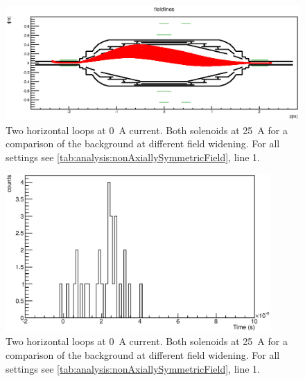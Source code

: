\begin{figure}
\centering
	\centerline{\includegraphics[width = 1.3\linewidth]{graphics/analysis/monSpec/fieldSimulation/ND.eps} }
	
	\caption[\SI{50}{\ampere} loops]{Two horizontal loops at \SI{0}{\ampere} current. Both solenoids at \SI{25}{\ampere} for a comparison of the background at different field widening. For all settings see \ref{tab:analysis:nonAxiallySymmetricField}, line 1.}
	\label{fig:NDf}
\end{figure}

\begin{figure}[h]
\centering
	\includegraphics[width = 0.9\textwidth]{graphics/analysis/monSpec/ND.eps}
	\caption[\SI{50}{\ampere} loops]{Two horizontal loops at \SI{0}{\ampere} current. Both solenoids at \SI{25}{\ampere} for a comparison of the background at different field widening. For all settings see \ref{tab:analysis:nonAxiallySymmetricField}, line 1.}
	\label{fig:ND}
\end{figure}
\clearpage








